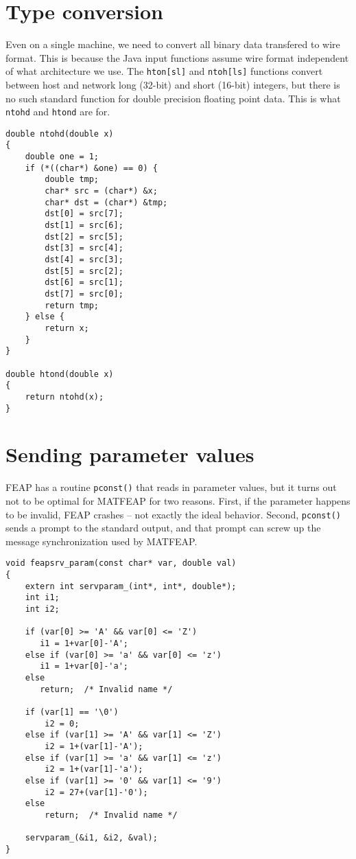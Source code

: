 \section{Type conversion}

Even on a single machine, we need to convert all binary data transfered
to wire format.  This is because the Java input functions assume wire
format independent of what architecture we use.  The {\tt hton[sl]} and
{\tt ntoh[ls]} functions convert between host and network long (32-bit)
and short (16-bit) integers, but there is no such standard function for
double precision floating point data.  This is what {\tt ntohd} and
{\tt htond} are for.

\begin{verbatim}
double ntohd(double x)
{
    double one = 1;
    if (*((char*) &one) == 0) {
        double tmp;
        char* src = (char*) &x;
        char* dst = (char*) &tmp;
        dst[0] = src[7];
        dst[1] = src[6];
        dst[2] = src[5];
        dst[3] = src[4];
        dst[4] = src[3];
        dst[5] = src[2];
        dst[6] = src[1];
        dst[7] = src[0];
        return tmp;
    } else {
        return x;
    }
}

double htond(double x)
{
    return ntohd(x);
}

\end{verbatim}
\section{Sending parameter values}

FEAP has a routine {\tt pconst()} that reads in parameter values, but it turns
out not to be optimal for MATFEAP for two reasons.  First, if the parameter
happens to be invalid, FEAP crashes -- not exactly the ideal behavior.
Second, {\tt pconst()} sends a prompt to the standard output, and that prompt
can screw up the message synchronization used by MATFEAP.

\begin{verbatim}
void feapsrv_param(const char* var, double val)
{
    extern int servparam_(int*, int*, double*);
    int i1;
    int i2;

    if (var[0] >= 'A' && var[0] <= 'Z')
       i1 = 1+var[0]-'A';
    else if (var[0] >= 'a' && var[0] <= 'z')
       i1 = 1+var[0]-'a';
    else
       return;  /* Invalid name */

    if (var[1] == '\0')
        i2 = 0;
    else if (var[1] >= 'A' && var[1] <= 'Z')
        i2 = 1+(var[1]-'A');
    else if (var[1] >= 'a' && var[1] <= 'z')
        i2 = 1+(var[1]-'a');
    else if (var[1] >= '0' && var[1] <= '9')
        i2 = 27+(var[1]-'0');
    else
        return;  /* Invalid name */

    servparam_(&i1, &i2, &val);
}


\end{verbatim}
